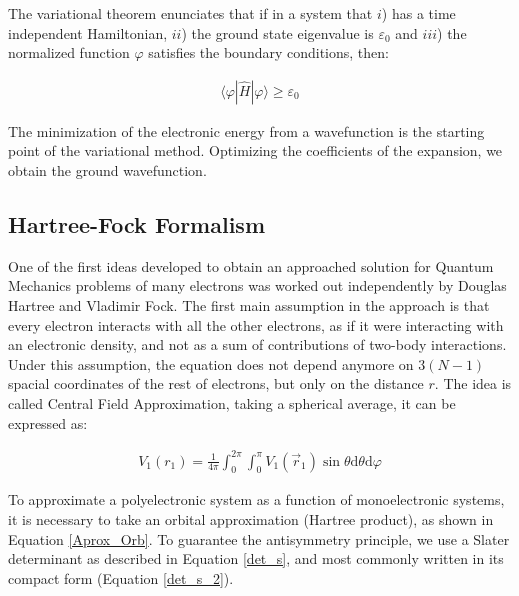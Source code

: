 The variational theorem enunciates that if in a system that $i$) has a time
independent Hamiltonian, $ii$) the ground state eigenvalue is $\varepsilon_0$
and $iii$) the normalized function $\varphi$ satisfies the boundary conditions,
then:

%
\begin{align}
\langle \varphi |\widehat{H}| \varphi \rangle \ge \varepsilon_{0}
\end{align}

The minimization of the electronic energy from a wavefunction is the starting
point of the variational method. Optimizing the coefficients of the expansion,
we obtain the ground wavefunction. 

\subsection{Hartree-Fock Formalism}

One of the first ideas developed to obtain an approached solution for Quantum
Mechanics problems of many electrons was worked out independently by Douglas
Hartree and Vladimir Fock. The first main assumption in the approach is that
every electron interacts with all the other electrons, as if it were
interacting with an electronic density, and not as a sum of contributions of
two-body interactions. Under this assumption, the equation does not depend
anymore on $3(N-1)$ spacial coordinates of the rest of electrons, but only on
the distance $r$. The idea is called Central Field Approximation, taking a
spherical average, it can be expressed as:

%
\begin{align}
  V_{1}(r_{1})=\frac{1}{4\pi}\int_{0}^{2\pi}\int_{0}^{\pi} V_{1}(\vec{r}_1)\sin\theta
  \mathrm{d}\theta \mathrm{d}\varphi
\end{align}

To approximate a polyelectronic system as a function of monoelectronic systems,
it is necessary to take an orbital approximation (Hartree product), as shown in
Equation \ref{Aprox_Orb}. To guarantee the antisymmetry principle, we use a
Slater determinant as described in Equation \ref{det_s}, and most commonly
written in its compact form (Equation \ref{det_s_2}).

